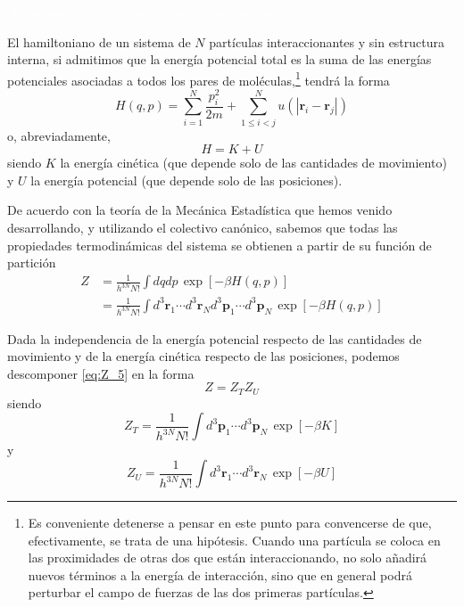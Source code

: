 \colorbox{red!60}{\textcolor{white}{\textit{[Esquemas, ya veré si los dejo aquí o más adelante]}}}

El hamiltoniano de un sistema de $N$ partículas interaccionantes y sin estructura interna, si admitimos que la energía potencial total es la suma de las energías potenciales asociadas a todos los pares de moléculas,\footnote{Es conveniente detenerse a pensar en este punto para convencerse de que, efectivamente, se trata de una hipótesis. Cuando una partícula se coloca en las proximidades de otras dos que están interaccionando, no solo añadirá nuevos términos a la energía de interacción, sino que en general podrá perturbar el campo de fuerzas de las dos primeras partículas.} tendrá la forma
\begin{equation}
	H(q,p) = \sum_{i=1}^N \frac{p_i^2}{2m} + \sum_{1 \leq i < j}^{N} u(|\mathbf{r}_i - \mathbf{r}_j|)
\end{equation}
o, abreviadamente,
\begin{equation}
	H = K + U
\end{equation}
siendo $K$ la energía cinética (que depende solo de las cantidades de movimiento) y $U$ la energía potencial (que depende solo de las posiciones).

De acuerdo con la teoría de la Mecánica Estadística que hemos venido desarrollando, y utilizando el colectivo canónico, sabemos que todas las propiedades termodinámicas del sistema se obtienen a partir de su función de partición
\begin{align}\label{eq:Z_5}
	Z &= \frac{1}{h^{3N} N!} \int dqdp \, \exp \left[ -\beta H(q,p) \right] \nonumber \\
	  &= \frac{1}{h^{3N} N!} \int d^3\mathbf{r}_1 \cdots d^3\mathbf{r}_N d^3\mathbf{p}_1 \cdots d^3\mathbf{p}_N \, \exp \left[ -\beta H(q,p) \right] 
\end{align}

Dada la independencia de la energía potencial respecto de las cantidades de movimiento y de la energía cinética respecto de las posiciones, podemos descomponer \eqref{eq:Z_5} en la forma
\begin{equation}\label{eq:Z_desc}
	Z = Z_T Z_U
\end{equation}
siendo
\begin{equation}
	Z_T = \frac{1}{h^{3N} N!} \int d^3\mathbf{p}_1 \cdots d^3\mathbf{p}_N \, \exp \left[ -\beta K \right] 
\end{equation}
y
\begin{equation}\label{eq:Z_u}
	Z_U = \frac{1}{h^{3N} N!} \int d^3\mathbf{r}_1 \cdots d^3\mathbf{r}_N \, \exp \left[ -\beta U \right]
\end{equation}

